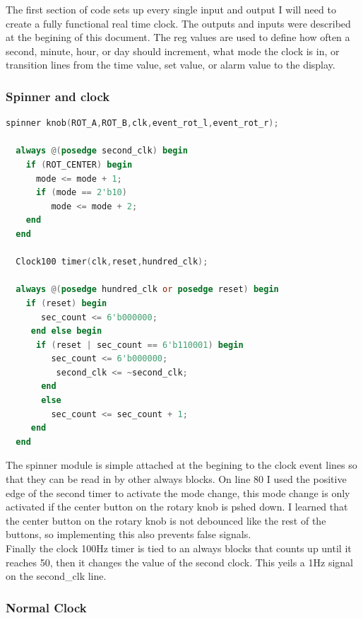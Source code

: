 \documentclass[12pt,a4paper,hidelinks]{article}            %
\begin{document}
The first section of code sets up every single input and output I will need to create a fully functional real time clock. The outputs and inputs were described at the begining of this document. The reg values are used to define how often a second, minute, hour, or day should increment, what mode the clock is in, or transition lines from the time value, set value, or alarm value to the display.

\subsubsection{Spinner and clock}

\begin{lstlisting}[language=Verilog,firstnumber=78]
  spinner knob(ROT_A,ROT_B,clk,event_rot_l,event_rot_r);
  
  always @(posedge second_clk) begin
    if (ROT_CENTER) begin
      mode <= mode + 1;
      if (mode == 2'b10)
         mode <= mode + 2;
    end
  end

  Clock100 timer(clk,reset,hundred_clk);
  
  always @(posedge hundred_clk or posedge reset) begin
    if (reset) begin
	   sec_count <= 6'b000000;
	 end else begin
      if (reset | sec_count == 6'b110001) begin
	     sec_count <= 6'b000000;
		  second_clk <= ~second_clk;
  	   end
	   else
	     sec_count <= sec_count + 1;
	 end
  end
\end{lstlisting}

The spinner module is simple attached at the begining to the clock event lines so that they can be read in by other always blocks. On line 80 I used the positive edge of the second timer to activate the mode change, this mode change is only activated if the center button on the rotary knob is pshed down. I learned that the center button on the rotary knob is not debounced like the rest of the buttons, so implementing this also prevents false signals.\\
Finally the clock 100Hz timer is tied to an always blocks that counts up until it reaches 50, then it changes the value of the second clock. This yeils a 1Hz signal on the second_clk line.

\subsubsection{Normal Clock}
\end{document}
